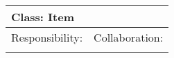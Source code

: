 \vspace{0.4cm}
\begin{tabular}{|p{7cm}|p{7cm}|} \hline
\multicolumn{2}{|l|}{Class:  Item} \\ \hline
Responsibility:  & Collaboration:  \\ \hline
 &  \\ 
\hline
\end{tabular}
\vspace{0.8cm}
